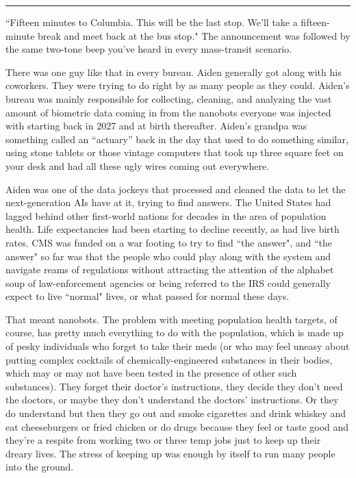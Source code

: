 \documentclass[11pt]{book}
\begin{document}
	\vspace{0.5cm}
	\hrule
	\vspace{0.5cm}
	
	``Fifteen minutes to Columbia. This will be the last stop. We'll take a fifteen-minute break and meet back at the bus stop." The announcement was followed by the same two-tone beep you've heard in every mass-transit scenario.
	
	There was one guy like that in every bureau. Aiden generally got along with his coworkers. They were trying to do right by as many people as they could. Aiden's bureau was mainly responsible for collecting, cleaning, and analyzing the vast amount of biometric data coming in from the nanobots everyone was injected with starting back in 2027 and at birth thereafter. Aiden's grandpa was something called an ``actuary'' back in the day that used to do something similar, using stone tablets or those vintage computers that took up three square feet on your desk and had all these ugly wires coming out everywhere.
	
	Aiden was one of the data jockeys that processed and cleaned the data to let the next-generation AIs have at it, trying to find answers. The United States had lagged behind other first-world nations for decades in the area of population health. Life expectancies had been starting to decline recently, as had live birth rates. CMS was funded on a war footing to try to find ``the answer", and ``the answer" so far was that the people who could play along with the system and navigate reams of regulations without attracting the attention of the alphabet soup of law-enforcement agencies or being referred to the IRS could generally expect to live ``normal" lives, or what passed for normal these days.
	
	That meant nanobots. The problem with meeting population health targets, of course, has pretty much everything to do with the population, which is made up of pesky individuals who forget to take their meds (or who may feel uneasy about putting complex cocktails of  chemically-engineered substances in their bodies, which may or may not have been tested in the presence of other such substances). They forget their doctor's instructions, they decide they don't need the doctors, or maybe they don't understand the doctors' instructions. Or they do understand but then they go out and smoke cigarettes and drink whiskey and eat cheeseburgers or fried chicken or do drugs because they feel or taste good and they're a respite from working two or three temp jobs just to keep up their dreary lives. The stress of keeping up was enough by itself to run many people into the ground.
	
\end{document}
